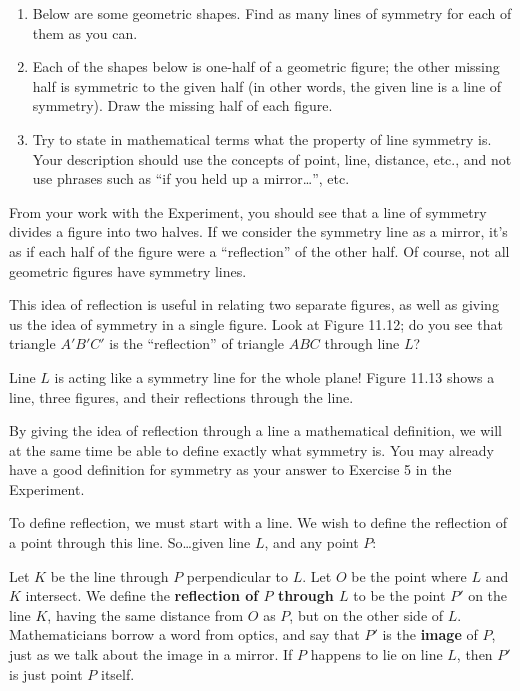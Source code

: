 \documentclass[12pt]{book} %
\begin{document}
\begin{ExerciseList}
\begin{enumerate}
\item Below are some geometric shapes. Find as many lines of symmetry for each of them as you can.


\item Each of the shapes below is one-half of a geometric figure; the other missing half is symmetric to the given half (in other words, the given line is a line of symmetry). Draw the missing half of each figure.


\item Try to state in mathematical terms what the property of line symmetry is. Your description should use the concepts of point, line, distance, etc., and not use phrases such as ``if you held up a mirror\ldots'', etc.
\end{enumerate}

From your work with the Experiment, you should see that a line of symmetry divides a figure into two halves. If we consider the symmetry line as a mirror, it's as if each half of the figure were a ``reflection'' of the other half. Of course, not all geometric figures have symmetry lines.

This idea of reflection is useful in relating two separate figures, as well as giving us the idea of symmetry in a single figure. Look at Figure 11.12; do you see that triangle $A'B'C'$ is the ``reflection'' of triangle $ABC$ through line $L$?


Line $L$ is acting like a symmetry line for the whole plane! Figure 11.13 shows a line, three figures, and their reflections through the line.


By giving the idea of reflection through a line a mathematical definition, we will at the same time be able to define exactly what symmetry is. You may already have a good definition for symmetry as your answer to Exercise 5 in the Experiment.

To define reflection, we must start with a line. We wish to define the reflection of a point through this line. So\ldots given line $L$, and any point $P$:


Let $K$ be the line through $P$ perpendicular to $L$. Let $O$ be the point where $L$ and $K$ intersect. We define the \textbf{reflection of $P$ through $L$} to be the point $P'$ on the line $K$, having the same distance from $O$ as $P$, but on the other side of $L$. Mathematicians borrow a word from optics, and say that $P'$ is the \textbf{image} of $P$, just as we talk about the image in a mirror. If $P$ happens to lie on line $L$, then $P'$ is just point $P$ itself.


\end{ExerciseList}
\end{document}
